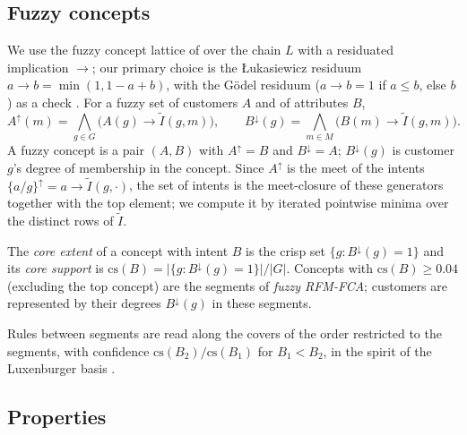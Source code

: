 \subsection{Fuzzy concepts}\label{sec:fuzzy-concepts}

We use the fuzzy concept lattice of \citet{belohlavek2002,belohlavek2004} over the chain $L$ with a residuated implication $\to$; our primary choice is the Łukasiewicz residuum $a \to b = \min(1, 1-a+b)$, with the Gödel residuum ($a \to b = 1$ if $a \le b$, else $b$) as a check \citep{hajek1998}. For a fuzzy set of customers $A$ and of attributes $B$,
\begin{equation}
A^{\uparrow}(m) = \bigwedge_{g \in G} \bigl(A(g) \to \tilde I(g,m)\bigr), \qquad
B^{\downarrow}(g) = \bigwedge_{m \in M} \bigl(B(m) \to \tilde I(g,m)\bigr).
\end{equation}
A fuzzy concept is a pair $(A,B)$ with $A^{\uparrow} = B$ and $B^{\downarrow} = A$; $B^{\downarrow}(g)$ is customer $g$'s degree of membership in the concept. Since $A^{\uparrow}$ is the meet of the intents $\{a/g\}^{\uparrow} = a \to \tilde I(g,\cdot)$, the set of intents is the meet-closure of these generators together with the top element; we compute it by iterated pointwise minima over the distinct rows of $\tilde I$.

\begin{definition}
The \emph{core extent} of a concept with intent $B$ is the crisp set $\{g : B^{\downarrow}(g) = 1\}$ and its \emph{core support} is $\mathrm{cs}(B) = |\{g : B^{\downarrow}(g) = 1\}| / |G|$. Concepts with $\mathrm{cs}(B) \ge 0.04$ (excluding the top concept) are the segments of \emph{fuzzy RFM-FCA}; customers are represented by their degrees $B^{\downarrow}(g)$ in these segments.
\end{definition}

Rules between segments are read along the covers of the order restricted to the segments, with confidence $\mathrm{cs}(B_2)/\mathrm{cs}(B_1)$ for $B_1 < B_2$, in the spirit of the Luxenburger basis \citep{luxenburger1991}.

\subsection{Properties}\label{sec:properties}

